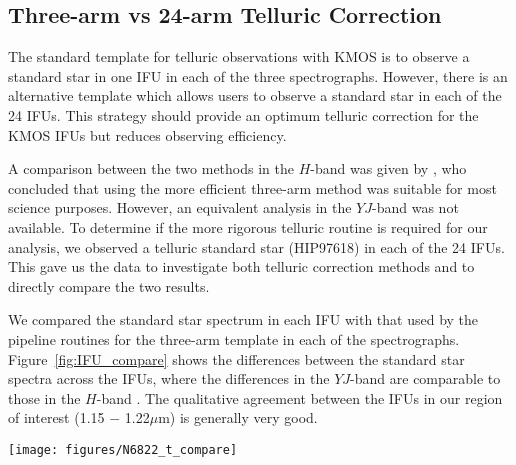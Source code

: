\documentclass[iop]{emulateapj}
\begin{document}
\subsection{Three-arm vs 24-arm Telluric Correction} %
\label{sub:three_arm_vs_24_arm_telluric_correction}

The standard template for telluric observations with KMOS is to observe a standard star in one IFU in each of the three spectrographs.
However, there is an alternative template which allows users to observe a standard star in each of the 24 IFUs.
This strategy should provide an optimum telluric correction for the KMOS IFUs but reduces observing efficiency.

A comparison between the two methods in the $H$-band was given by
\cite{2013A&A...558A..56D},
who concluded that using the more efficient three-arm method was suitable for most science purposes.
However, an equivalent analysis in the $YJ$-band was not available.
To determine if the more rigorous telluric routine is required for our analysis,
we observed a telluric standard star (HIP97618) in each of the 24 IFUs.
This gave us the data to investigate both telluric correction methods and to directly compare the two results.

We compared the standard star spectrum in each IFU with that used by the pipeline routines for the three-arm template in each of the spectrographs.
Figure~\ref{fig:IFU_compare} shows the differences between the standard star spectra across the IFUs,
where the differences in the $YJ$-band are comparable to those in the $H$-band
\cite[cf. Fig.7 from][]{2013A&A...558A..56D}.
The qualitative agreement between the IFUs in our region of interest (1.15 $-$ 1.22$\mu$m) is generally very good.


\begin{figure*}
 \begin{center}
 \texttt{[image: figures/N6822\_t\_compare]}
 \caption{
    Comparison of $J$-band spectra of the same standard star in each IFU.
    The ratio of each spectrum compared to that from the IFU used in the three-arm telluric method is shown,
    with their respective mean and standard deviation ($\mu$ and $\sigma$).
    Red lines indicate $\mu$~=~1.0, $\sigma$~=~0.0 for each ratio.
    The blue shaded area signifies the region used in our analysis,
    within which, the discrepancies between the IFUs are generally small.
    This is reflected in the standard deviation values when only considering this region.
    (IFUs 13 and 16 are omitted as no data were taken with these IFUs.) \label{fig:IFU_compare}
          }
 \end{center}
\end{figure*}
\end{document}
